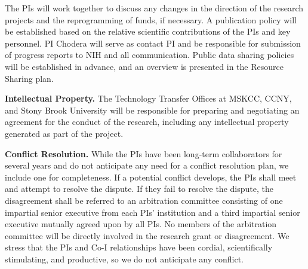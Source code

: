 \documentclass[11pt]{article}
\begin{document}
The PIs will work together to discuss any changes in the direction of the research projects and the reprogramming of funds, if necessary. 
A publication policy will be established based on the relative scientific contributions of the PIs and key personnel.  
PI Chodera will serve as contact PI and be responsible for submission of progress reports to NIH and all communication.
Public data sharing policies will be established in advance, and an overview is presented in the Resource Sharing plan.

{\bf Intellectual Property.}
The Technology Transfer Offices at MSKCC, CCNY, and Stony Brook University will be responsible for preparing and negotiating an agreement for the conduct of the research, including any intellectual property generated as part of the project. 

{\bf Conflict Resolution.}
While the PIs have been long-term collaborators for several years and do not anticipate any need for a conflict resolution plan, we include one for completeness.  
If a potential conflict develops, the PIs shall meet and attempt to resolve the dispute. 
If they fail to resolve the dispute, the disagreement shall be referred to an arbitration committee consisting of one impartial senior executive from each PIs' institution and a third impartial senior executive mutually agreed upon by all PIs. 
No members of the arbitration committee will be directly involved in the research grant or disagreement. 
We stress that the PIs and Co-I relationships have been cordial, scientifically stimulating, and productive, so we do not anticipate any conflict.


  

\newpage

%
%


\end{document}
